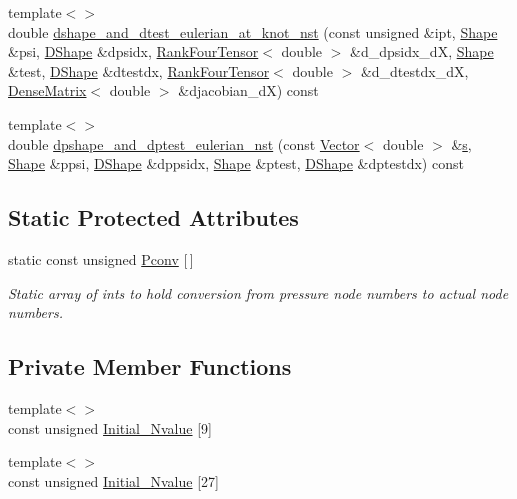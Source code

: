 \begin{DoxyCompactItemize}
\item 
{\footnotesize template$<$$>$ }\\double \hyperlink{classoomph_1_1GeneralisedNewtonianQTaylorHoodElement_a1af80e7020a0010004b2500b68ed1e87}{dshape\+\_\+and\+\_\+dtest\+\_\+eulerian\+\_\+at\+\_\+knot\+\_\+nst} (const unsigned \&ipt, \hyperlink{classoomph_1_1Shape}{Shape} \&psi, \hyperlink{classoomph_1_1DShape}{D\+Shape} \&dpsidx, \hyperlink{classoomph_1_1RankFourTensor}{Rank\+Four\+Tensor}$<$ double $>$ \&d\+\_\+dpsidx\+\_\+dX, \hyperlink{classoomph_1_1Shape}{Shape} \&test, \hyperlink{classoomph_1_1DShape}{D\+Shape} \&dtestdx, \hyperlink{classoomph_1_1RankFourTensor}{Rank\+Four\+Tensor}$<$ double $>$ \&d\+\_\+dtestdx\+\_\+dX, \hyperlink{classoomph_1_1DenseMatrix}{Dense\+Matrix}$<$ double $>$ \&djacobian\+\_\+dX) const
\item 
{\footnotesize template$<$$>$ }\\double \hyperlink{classoomph_1_1GeneralisedNewtonianQTaylorHoodElement_adcab5a752161a37601f9019aca18dab8}{dpshape\+\_\+and\+\_\+dptest\+\_\+eulerian\+\_\+nst} (const \hyperlink{classoomph_1_1Vector}{Vector}$<$ double $>$ \&\hyperlink{cfortran_8h_ab7123126e4885ef647dd9c6e3807a21c}{s}, \hyperlink{classoomph_1_1Shape}{Shape} \&ppsi, \hyperlink{classoomph_1_1DShape}{D\+Shape} \&dppsidx, \hyperlink{classoomph_1_1Shape}{Shape} \&ptest, \hyperlink{classoomph_1_1DShape}{D\+Shape} \&dptestdx) const
\end{DoxyCompactItemize}
\subsection*{Static Protected Attributes}
\begin{DoxyCompactItemize}
\item 
static const unsigned \hyperlink{classoomph_1_1GeneralisedNewtonianQTaylorHoodElement_a9c2f535b509bb05dafb4b912d52281da}{Pconv} \mbox{[}$\,$\mbox{]}
\begin{DoxyCompactList}\small\item\em Static array of ints to hold conversion from pressure node numbers to actual node numbers. \end{DoxyCompactList}\end{DoxyCompactItemize}
\subsection*{Private Member Functions}
\begin{DoxyCompactItemize}
\item 
{\footnotesize template$<$$>$ }\\const unsigned \hyperlink{classoomph_1_1GeneralisedNewtonianQTaylorHoodElement_a96ccdd3dc265d0e764cbfdd76c312c5a}{Initial\+\_\+\+Nvalue} \mbox{[}9\mbox{]}
\item 
{\footnotesize template$<$$>$ }\\const unsigned \hyperlink{classoomph_1_1GeneralisedNewtonianQTaylorHoodElement_aca5220256d955ee60a4de07709ac5914}{Initial\+\_\+\+Nvalue} \mbox{[}27\mbox{]}
\end{DoxyCompactItemize}

